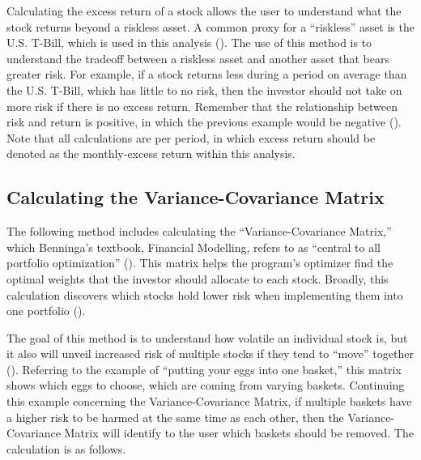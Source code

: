 \documentclass[12pt,english]{article}
\begin{document}
                \begin{doublespace}
            
            \indent{}\indent{}
            Calculating the excess return of a stock allows the user to understand what the stock returns beyond a riskless asset. A common proxy for a “riskless” asset is the U.S. T-Bill, which is used in this analysis (\citet{Simon2008}). The use of this method is to understand the tradeoff between a riskless asset and another asset that bears greater risk. For example, if a stock returns less during a period on average than the U.S. T-Bill, which has little to no risk, then the investor should not take on more risk if there is no excess return. Remember that the relationship between risk and return is positive, in which the previous example would be negative (\citet{Simon2008}). Note that all calculations are per period, in which excess return should be denoted as the monthly-excess return within this analysis. 
        
        \subsection{Calculating the Variance-Covariance Matrix}
        
            \indent{}\indent{}
        	The following method includes calculating the “Variance-Covariance Matrix,” which Benninga’s textbook, Financial Modelling, refers to as “central to all portfolio optimization” (\citet{Simon2008}). This matrix helps the program’s optimizer find the optimal weights that the investor should allocate to each stock. Broadly, this calculation discovers which stocks hold lower risk when implementing them into one portfolio (\citet{Simon2008}). 
            
            \indent{}\indent{}
        	The goal of this method is to understand how volatile an individual stock is, but it also will unveil increased risk of multiple stocks if they tend to “move” together (\citet{Simon2008}). Referring to the example of “putting your eggs into one basket,” this matrix shows which eggs to choose, which are coming from varying baskets. Continuing this example concerning the Variance-Covariance Matrix, if multiple baskets have a higher risk to be harmed at the same time as each other, then the Variance-Covariance Matrix will identify to the user which baskets should be removed. The calculation is as follows.
            
                \end{doublespace}    
\end{document}
